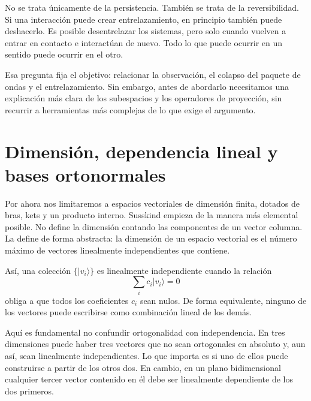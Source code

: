 No se trata únicamente de la persistencia. También se trata de la reversibilidad. Si una interacción puede crear entrelazamiento, en principio también puede deshacerlo. Es posible desentrelazar los sistemas, pero solo cuando vuelven a entrar en contacto e interactúan de nuevo. Todo lo que puede ocurrir en un sentido puede ocurrir en el otro.

\begin{classroomqa}\end{classroomqa}

Esa pregunta fija el objetivo: relacionar la observación, el colapso del paquete de ondas y el entrelazamiento. Sin embargo, antes de abordarlo necesitamos una explicación más clara de los subespacios y los operadores de proyección, sin recurrir a herramientas más complejas de lo que exige el argumento.

\section{Dimensión, dependencia lineal y bases ortonormales}

Por ahora nos limitaremos a espacios vectoriales de dimensión finita, dotados de bras, kets y un producto interno. Susskind empieza de la manera más elemental posible. No define la dimensión contando las componentes de un vector columna. La define de forma abstracta: la dimensión de un espacio vectorial es el número máximo de vectores linealmente independientes que contiene.

Así, una colección \(\{|v_i\rangle\}\) es linealmente independiente cuando la relación
\begin{equation}
\sum_i c_i |v_i\rangle = 0
\end{equation}
obliga a que todos los coeficientes \(c_i\) sean nulos. De forma equivalente, ninguno de los vectores puede escribirse como combinación lineal de los demás.

Aquí es fundamental no confundir ortogonalidad con independencia. En tres dimensiones puede haber tres vectores que no sean ortogonales en absoluto y, aun así, sean linealmente independientes. Lo que importa es si uno de ellos puede construirse a partir de los otros dos. En cambio, en un plano bidimensional cualquier tercer vector contenido en él debe ser linealmente dependiente de los dos primeros.

